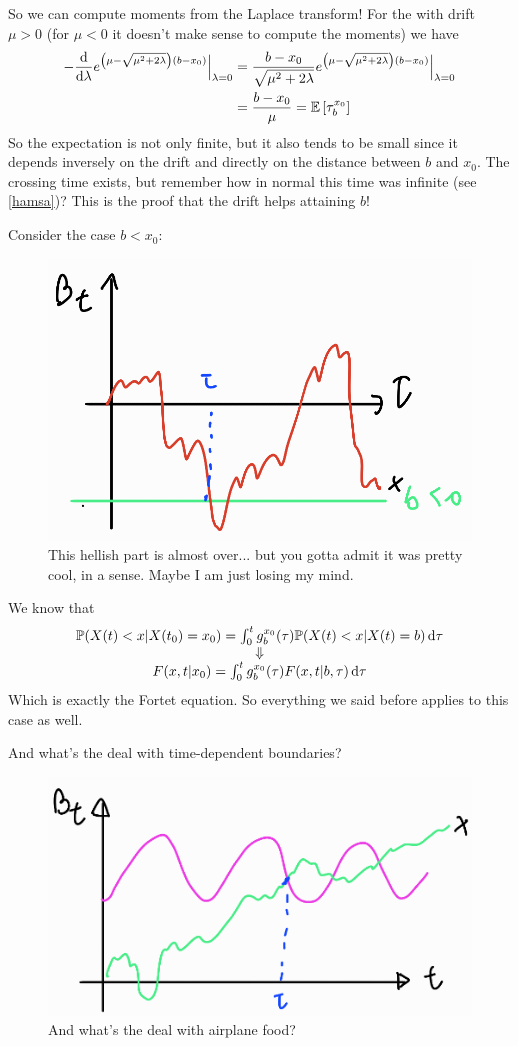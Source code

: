 \documentclass[12pt]{report}
\begin{document}
So we can compute moments from the Laplace transform! For the \bwm{} with drift $\mu>0$ (for $\mu<0$ it doesn't make sense to compute the moments) we have
\begin{align*}
	-\frac{\mathop{}\!\mathrm{d}}{\mathop{}\!\mathrm{d}\lambda}e^{\left(\mu-\sqrt{\mu^{2}+2\lambda}\right)(b-x_{0})}\Big|_{\lambda=0}&=\frac{b-x_{0}}{\sqrt{\mu^{2}+2\lambda}}e^{\left(\mu-\sqrt{\mu^{2}+2\lambda}\right)(b-x_{0})}\Big|_{\lambda=0}\\
	&=\frac{b-x_{0}}{\mu}=\mathbb{E}\left[\tau_{b}^{x_{0}}\right]
\end{align*}
So the expectation is not only finite, but it also tends to be small since it depends inversely on the drift and directly on the distance between $b$ and $x_{0}$. The crossing time exists, but remember how in normal \bwm{} this time was infinite (see \ref{hamsa})? This is the proof that the drift helps attaining $b$!\par
Consider the case $b<x_{0}$:
\begin{figure}[H]
	\centering
	\includegraphics[width=0.4\linewidth]{img/screenshot028}
	\caption{This hellish part is almost over... but you gotta admit it was pretty cool, in a sense. Maybe I am just losing my mind.}
	\label{fig:screenshot028}
\end{figure}
We know that 
\begin{equation*}
	\begin{array}{c}
		\mathbb{P}(X(t)<x|X(t_{0})=x_{0})=\int_{0}^{t}g_{b}^{x_{0}}(\tau)\mathbb{P}(X(t)<x|X(t)=b)\mathop{}\!\mathrm{d}\tau\\
		\Downarrow\\
		F(x,t|x_{0})=\int_{0}^{t}g_{b}^{x_{0}}(\tau)F(x,t|b,\tau)\mathop{}\!\mathrm{d}\tau
	\end{array}
\end{equation*}
Which is exactly the Fortet equation. So everything we said before applies to this case as well.\par
And what's the deal with time-dependent boundaries?
\begin{figure}[H]
	\centering
	\includegraphics[width=0.5\linewidth]{img/screenshot029}
	\caption{And what's the deal with airplane food?}
	\label{fig:screenshot029}
\end{figure}
\end{document}
